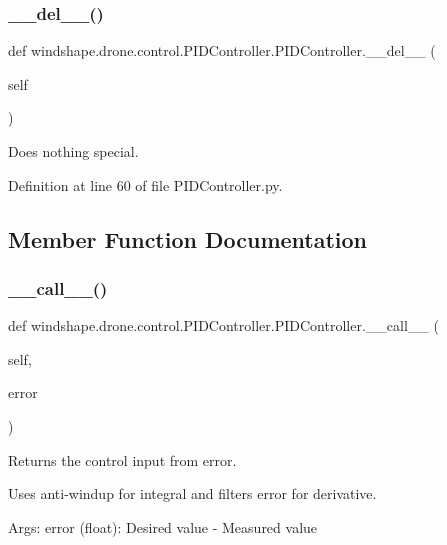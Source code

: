 \subsubsection{\texorpdfstring{\+\_\+\+\_\+del\+\_\+\+\_\+()}{\_\_del\_\_()}}
{\footnotesize\ttfamily def windshape.\+drone.\+control.\+P\+I\+D\+Controller.\+P\+I\+D\+Controller.\+\_\+\+\_\+del\+\_\+\+\_\+ (\begin{DoxyParamCaption}\item[{}]{self }\end{DoxyParamCaption})}

\begin{DoxyVerb}Does nothing special.\end{DoxyVerb}
 

Definition at line 60 of file P\+I\+D\+Controller.\+py.



\subsection{Member Function Documentation}
\mbox{\label{classwindshape_1_1drone_1_1control_1_1_p_i_d_controller_1_1_p_i_d_controller_a932a9bc5936376c1da6f9df14f27f215}} 
\subsubsection{\texorpdfstring{\+\_\+\+\_\+call\+\_\+\+\_\+()}{\_\_call\_\_()}}
{\footnotesize\ttfamily def windshape.\+drone.\+control.\+P\+I\+D\+Controller.\+P\+I\+D\+Controller.\+\_\+\+\_\+call\+\_\+\+\_\+ (\begin{DoxyParamCaption}\item[{}]{self,  }\item[{}]{error }\end{DoxyParamCaption})}

\begin{DoxyVerb}Returns the control input from error.

Uses anti-windup for integral and filters error for derivative.

Args:
    error (float): Desired value - Measured value
\end{DoxyVerb}
 

